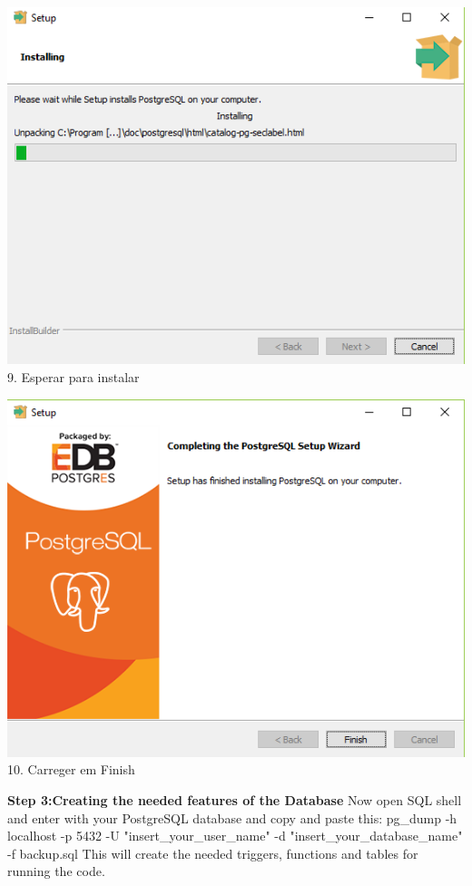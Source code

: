 \documentclass[a4paper, 11pt]{article}
\begin{document}
\begin{minipage}{0.45\textwidth}
  \includegraphics[width=\textwidth]{Screenshot-830.png}
  9. Esperar para instalar
\end{minipage}\hfill
\begin{minipage}{0.45\textwidth}
  \includegraphics[width=\textwidth]{Screenshot-937.png}
  10. Carreger em Finish
\end{minipage}

\textbf{Step 3:Creating the needed features of the Database}
Now open SQL shell and enter with your PostgreSQL database and copy and paste this:
pg_dump -h localhost -p 5432 -U "insert_your_user_name" -d "insert_your_database_name" -f backup.sql 
This will create the needed triggers, functions and tables for running the code.
\end{document}

